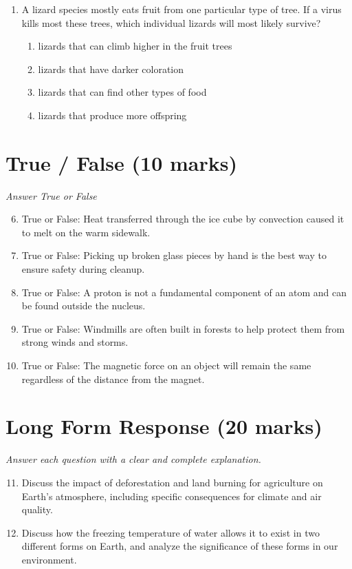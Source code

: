 \documentclass[12pt]{article}
\begin{document}
\begin{enumerate}[label=\arabic*.]
\begin{enumerate}[label=(\alph*)]
    \item the source that created the sound
    \item the distance between molecules in the medium
\end{enumerate}
\item A lizard species mostly eats fruit from one particular type of tree. If a virus kills most
these trees, which individual lizards will most likely survive?
\begin{enumerate}[label=(\alph*)]
    \item lizards that can climb higher in the fruit trees
    \item lizards that have darker coloration
    \item lizards that can find other types of food
    \item lizards that produce more offspring
\end{enumerate}
\end{enumerate}

\section*{True / False (10 marks)}
\textit{Answer True or False}
\begin{enumerate}[label=\arabic*.]
\setcounter{enumi}{5}
\item True or False: Heat transferred through the ice cube by convection caused it to melt on the warm sidewalk.
\item True or False: Picking up broken glass pieces by hand is the best way to ensure safety during cleanup.
\item True or False: A proton is not a fundamental component of an atom and can be found outside the nucleus.
\item True or False: Windmills are often built in forests to help protect them from strong winds and storms.
\item True or False: The magnetic force on an object will remain the same regardless of the distance from the magnet.
\end{enumerate}

\section*{Long Form Response (20 marks)}
\textit{Answer each question with a clear and complete explanation.}
\begin{enumerate}[label=\arabic*.]
\setcounter{enumi}{10}
\item Discuss the impact of deforestation and land burning for agriculture on Earth's
atmosphere, including specific consequences for climate and air quality.
\item Discuss how the freezing temperature of water allows it to exist in two different forms on
Earth, and analyze the significance of these forms in our environment.
\end{enumerate}
\end{document}
